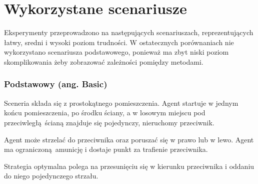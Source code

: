 \section{Wykorzystane scenariusze}
Eksperymenty przeprowadzono na następujących scenariuszach, reprezentujących łatwy, sredni i wysoki poziom trudności. W ostatecznych porównaniach nie wykorzystano scenariusza podstawowego, ponieważ ma zbyt niski poziom skomplikowania żeby zobrazować zależności pomiędzy metodami.

\subsubsection{Podstawowy (ang. Basic)}\label{scenario_basic}
Sceneria składa się z prostokątnego pomieszczenia. Agent startuje w jednym końcu pomieszczenia, po środku ściany, a w losowym miejscu pod przeciwległą ścianą znajduje się pojedynczy, nieruchomy przeciwnik.

Agent może strzelać do przeciwnika oraz poruszać się w prawo lub w lewo. Agent ma ograniczoną amunicję i dostaje punkt za trafienie przeciwnika.

Strategia optymalna polega na przesunięciu się w kierunku przeciwnika i oddaniu do niego pojedynczego strzału.


\begin{figure}[H]
	\begin{floatrow}
	\end{floatrow}
\end{figure}

